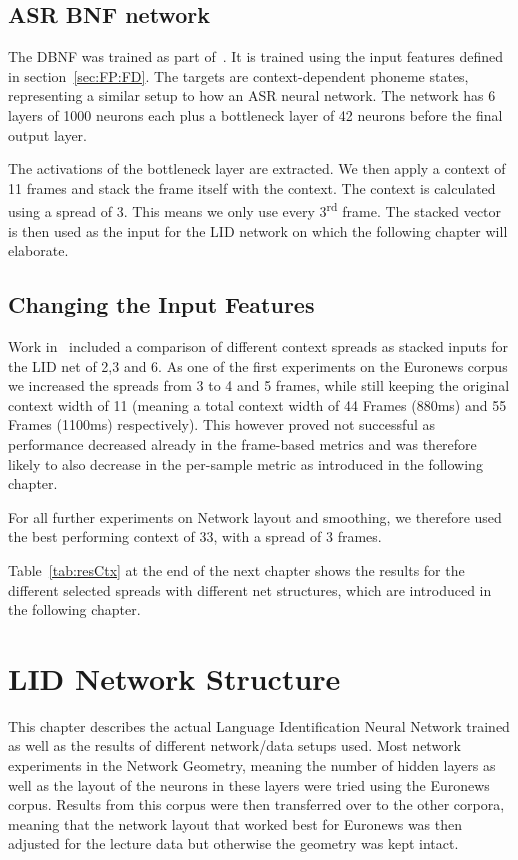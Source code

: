 \section{ASR BNF network}
\label{sec:FP:Net}

The DBNF was trained as part of~\cite{Mueller2016b}. It is trained using the input features defined in section~\ref{sec:FP:FD}. The targets are context-dependent phoneme states, representing a similar setup to how an ASR neural network. The network has 6 layers of 1000 neurons each plus a bottleneck layer of 42 neurons before the final output layer. 

The activations of the bottleneck layer are extracted. We then apply a context of 11 frames and stack the frame itself with the context. The context is calculated using a spread of 3. This means we only use every 3\textsuperscript{rd} frame. The stacked vector is then used as the input for the LID network on which the following chapter will elaborate. 


\section{Changing the Input Features}
\label{sec:LIDNetwork:Input}

Work in~\cite{Mueller2016b} included a comparison of different context spreads as stacked inputs for the LID net of 2,3 and 6. As one of the first experiments on the Euronews corpus we increased the spreads from 3 to 4 and 5 frames, while still keeping the original context width of 11 (meaning a total context width of 44 Frames (880ms) and 55 Frames (1100ms) respectively). This however proved not successful as performance decreased already in the frame-based metrics and was therefore likely to also decrease in the per-sample metric as introduced in the following chapter. 

For all further experiments on Network layout and smoothing, we therefore used the best performing context of 33, with a spread of 3 frames.

Table~\ref{tab:resCtx} at the end of the next chapter shows the results for the different selected spreads with different net structures, which are introduced in the following chapter.

\chapter{LID Network Structure}
\label{ch:LIDNetwork}

This chapter describes the actual Language Identification Neural Network trained as well as the results of different network/data setups used. Most network experiments in the Network Geometry, meaning the number of hidden layers as well as the layout of the neurons in these layers were tried using the Euronews corpus. Results from this corpus were then transferred over to the other corpora, meaning that the network layout that worked best for Euronews was then adjusted for the lecture data but otherwise the geometry was kept intact.

